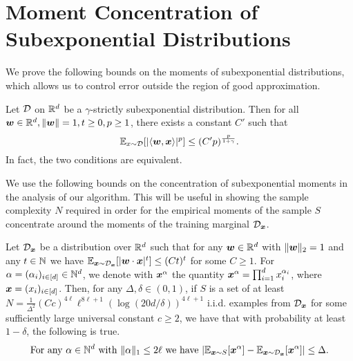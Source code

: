 \section{Moment Concentration of Subexponential Distributions}

We prove the following bounds on the moments of subexponential distributions, which allows us to control error outside the region of good approximation.
\begin{fact} \label{fact:moment_bound}
    Let ${\mathcal{D}}$ on $\mathbb{R}^d$ be a $\gamma$-strictly subexponential distribution. Then for all ${\bm{w}} \in \mathbb{R}^d, \left\| {\bm{w}} \right\| = 1, t \ge 0, p \ge 1$, there exists a constant $C'$ such that \[\mathbb{E}_{x \sim {\mathcal{D}}}[|\langle {\bm{w}}, {\bm{x}}\rangle|^p] \le (C'p)^{\frac{p}{1+\gamma}}.\] In fact, the two conditions are equivalent.
\end{fact}

We use the following bounds on the concentration of subexponential moments in the analysis of our algorithm. This will be useful in showing the sample complexity $N$ required in order for the empirical moments of the sample $S$ concentrate around the moments of the training marginal ${\mathcal{D}}_{{\bm{x}}}$.
\begin{lemma}\label{lemma:moment-concentration}
    Let ${\mathcal{D}}_{{\bm{x}}}$ be a distribution over $\mathbb{R}^d$ such that for any ${\bm{w}}\in\mathbb{R}^d$ with $\|{\bm{w}}\|_2 =1$ and any $t\in{\mathbb{N}}$ we have $\mathbb{E}_{{\bm{x}}\sim {\mathcal{D}}_{{\bm{x}}}}[|{\bm{w}}\cdot {\bm{x}}|^t] \le (Ct)^{t}$ for some $C\ge 1$. For $\alpha=(\alpha_i)_{i\in [d]}\in {\mathbb{N}}^d$, we denote with ${\bm{x}}^\alpha$ the quantity ${\bm{x}}^\alpha = \prod_{i=1}^d x_i^{\alpha_i}$, where ${\bm{x}} = (x_i)_{i\in [d]}$. Then, for any $\Delta, \delta\in(0,1)$, if $S$ is a set of at least $N = \frac{1}{\Delta^2}{(Cc)^{4\ell} \ell^{8\ell +1} (\log(20d/\delta))^{4\ell+1}}$ i.i.d. examples from ${\mathcal{D}}_{{\bm{x}}}$ for some sufficiently large universal constant $c\ge 2$, we have that with probability at least $1-\delta$, the following is true.
    \[
        \text{For any $\alpha\in{\mathbb{N}}^d$ with $\|\alpha\|_1 \le 2\ell$ we have } |\mathbb{E}_{{\bm{x}}\sim S}[{\bm{x}}^\alpha] - \mathbb{E}_{{\bm{x}}\sim {\mathcal{D}}_{{\bm{x}}}}[{\bm{x}}^\alpha]| \le \Delta.
    \]
\end{lemma}

